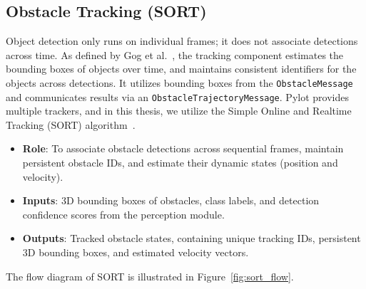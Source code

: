 \documentclass[11pt,a4paper]{report}
\begin{document}
\subsection{Obstacle Tracking (SORT)}
Object detection only runs on individual frames; it does not associate detections across time. As defined by Gog et al.~\cite{erdos_pylot}, the tracking component estimates the bounding boxes of objects over time, and maintains consistent identifiers for the objects across detections. It utilizes bounding boxes from the \texttt{ObstacleMessage} and communicates results via an \texttt{ObstacleTrajectoryMessage}. Pylot provides multiple trackers, and in this thesis, we utilize the Simple Online and Realtime Tracking (SORT) algorithm~\cite{sort_tracker}. 
\begin{itemize}
    \item \textbf{Role}: To associate obstacle detections across sequential frames, maintain persistent obstacle IDs, and estimate their dynamic states (position and velocity).
    \item \textbf{Inputs}: 3D bounding boxes of obstacles, class labels, and detection confidence scores from the perception module.
    \item \textbf{Outputs}: Tracked obstacle states, containing unique tracking IDs, persistent 3D bounding boxes, and estimated velocity vectors.
\end{itemize}
The flow diagram of SORT is illustrated in Figure~\ref{fig:sort_flow}.
\end{document}
